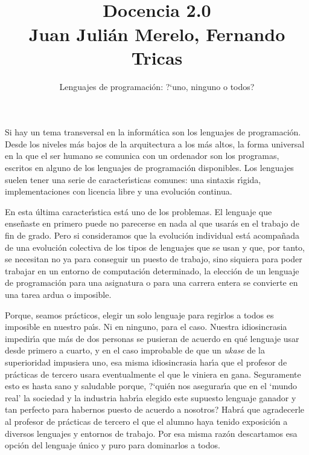 \documentclass[twoside,10pt]{article}
\title{\ \\ Docencia 2.0\\ \large Juan Juli\'{a}n Merelo, Fernando Tricas}
\author{\LARGE Lenguajes de programaci\'on: ?`uno, ninguno o todos?}
\date{}
\newcounter{vol}
\begin{document}
\addtocounter{page}{2}

\maketitle

\vspace*{-5ex}

\begin{multicols}{2}

Si hay un tema transversal en la inform\'atica son los lenguajes de
programaci\'on. Desde los niveles m\'as bajos de la arquitectura a los m\'as
altos, la forma universal en la que el ser humano se comunica con un
ordenador son los programas, escritos en alguno de los lenguajes de
programaci\'on disponibles. Los lenguajes suelen tener una serie de
caracter\'{\i}sticas comunes: una sintaxis r\'{\i}gida, implementaciones con
licencia libre y una evoluci\'on continua.

En esta \'ultima caracter\'{\i}stica est\'a uno de los problemas. El lenguaje
que ense\~{n}aste en primero puede no parecerse en nada al que usar\'as en
el trabajo de fin de grado. Pero si consideramos que la evoluci\'on
individual est\'a acompa\~{n}ada de una evoluci\'on colectiva de los tipos de
lenguajes que se usan y que, por tanto, se necesitan no ya para
conseguir un puesto de trabajo, sino siquiera para poder trabajar en
un entorno de computaci\'on determinado, la elecci\'on de un lenguaje de
programaci\'on para una asignatura o para una carrera entera se convierte en
una tarea ardua o imposible.

Porque, seamos pr\'acticos, elegir un solo lenguaje para regirlos a
todos es imposible en nuestro pa\'{\i}s. Ni en ninguno, para el caso.
Nuestra idiosincrasia impedir\'{\i}a que m\'as de dos personas se pusieran de
acuerdo en qu\'e lenguaje usar desde primero a cuarto, y en el caso
improbable de que un {\em ukase} de la superioridad impusiera uno, esa
misma idiosincrasia har\'{\i}a que el profesor de pr\'acticas de tercero usara
eventualmente el que le viniera en gana. 
Seguramente esto es hasta sano y saludable porque, ?`qui\'en nos asegurar\'{\i}a
que en el `mundo real' la sociedad y la industria habr\'{\i}a elegido este
supuesto lenguaje ganador y tan perfecto para habernos puesto de acuerdo a
nosotros? Habr\'a que agradecerle al profesor de pr\'acticas de tercero el que
el alumno  haya tenido exposici\'on a diversos lenguajes y
entornos de trabajo. Por esa misma raz\'on descartamos esa opci\'on
del lenguaje \'unico y puro para dominarlos a todos.


\end{multicols}
\end{document}
